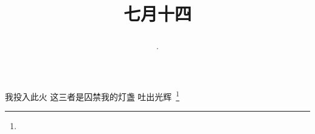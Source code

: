 \title{\date[d=17,m=8,y=2024][year:cn-y,年,month:cn,day:cn,日,·,weekday]·七月十四 }
我投入此火 这三者是囚禁我的灯盏 吐出光辉 \footnote{ }

